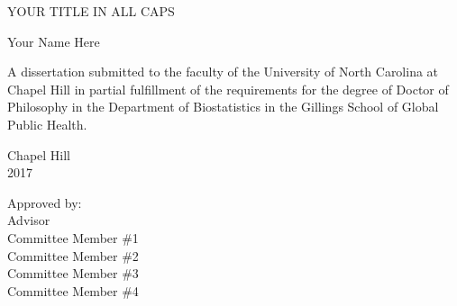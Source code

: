 \begin{titlepage}
\begin{center}


\vspace{2in}
\begin{singlespace}
YOUR TITLE IN ALL CAPS
\end{singlespace}


\vspace{61pt} %
Your Name Here
\end{center}

\vspace{50pt}
\begin{singlespace}
\begin{center}
\noindent 
A dissertation submitted to the faculty of the University of North Carolina at Chapel Hill in partial fulfillment of the requirements for the degree of Doctor of Philosophy in the Department of Biostatistics in the Gillings School of Global Public Health.
\end{center}
\end{singlespace}


\vspace{50pt}
\begin{center}
\begin{singlespace} 
Chapel Hill\\
2017
\end{singlespace}
\end{center}

 

\vfill
\begin{flushright}
\begin{minipage}[t]{1.5in} 
Approved by:\\
Advisor \\
Committee Member \#1 \\
Committee Member \#2 \\
Committee Member \#3 \\
Committee Member \#4 
\end{minipage}
\end{flushright}

\end{titlepage}